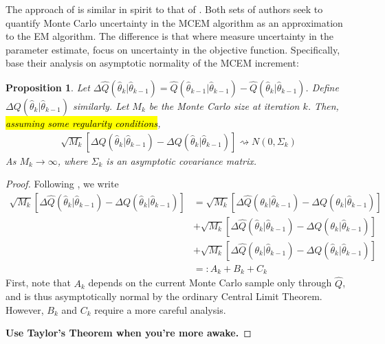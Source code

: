 \documentclass[11pt, oneside]{article}   	%
\newtheorem{proposition}{Proposition}[section]
\begin{document}
The approach of \citet{Caf05} is similar in spirit to that of \citet{Boo99}. Both sets of authors seek to quantify Monte Carlo uncertainty in the MCEM algorithm as an approximation to the EM algorithm. The difference is that where \citeauthor{Boo99} measure uncertainty in the parameter estimate, \citeauthor{Caf05} focus on uncertainty in the objective function. Specifically, \citeauthor{Caf05} base their analysis on asymptotic normality of the MCEM increment:
%
\begin{proposition}
    \label{thm:Caf_normality}
    Let $\Delta \hat{Q}(\hat{\theta}_k|\hat{\theta}_{k-1}) = \hat{Q}(\hat{\theta}_{k-1}|\hat{\theta}_{k-1}) - \hat{Q}(\hat{\theta}_k|\hat{\theta}_{k-1})$. Define $\Delta Q(\hat{\theta}_k|\hat{\theta}_{k-1})$ similarly. Let $M_k$ be the Monte Carlo size at iteration $k$. Then, \hl{assuming some regularity conditions},
    \begin{align}
        \sqrt{M_k} \left[ \Delta \hat{Q}(\hat{\theta}_k|\hat{\theta}_{k-1}) - \Delta Q(\hat{\theta}_k|\hat{\theta}_{k-1}) \right] \rightsquigarrow N(0, \Sigma_k)
    \end{align}
    As $M_k \rightarrow \infty$, where $\Sigma_k$ is an asymptotic covariance matrix.
\end{proposition}

\begin{proof}
    Following \citet{Caf05}, we write
    \begin{align}
        \sqrt{M_k} \left[ \Delta \hat{Q}(\hat{\theta}_k|\hat{\theta}_{k-1}) - \Delta Q(\hat{\theta}_k|\hat{\theta}_{k-1}) \right] &= \sqrt{M_k} \left[ \Delta \hat{Q}(\theta_k|\hat{\theta}_{k-1}) - \Delta Q(\theta_k|\hat{\theta}_{k-1}) \right] \nonumber \\
        & + \sqrt{M_k} \left[ \Delta \hat{Q}(\hat{\theta}_k|\hat{\theta}_{k-1}) - \Delta Q(\theta_k|\hat{\theta}_{k-1}) \right]\\
        & + \sqrt{M_k} \left[ \Delta \hat{Q}(\theta_k|\hat{\theta}_{k-1}) - \Delta Q(\hat{\theta}_k|\hat{\theta}_{k-1}) \right]\\
        &=: A_k + B_k + C_k
    \end{align}
    First, note that $A_k$ depends on the current Monte Carlo sample only through $\hat{Q}$, and is thus asymptotically normal by the ordinary Central Limit Theorem. However, $B_k$ and $C_k$ require a more careful analysis.

    \textbf{Use Taylor's Theorem when you're more awake.}
\end{proof}
\end{document}
